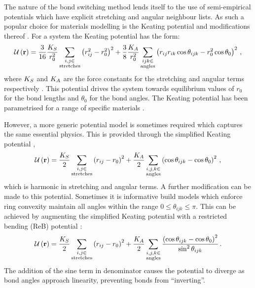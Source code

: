 The nature of the bond switching method lends itself to the use of semi\--empirical potentials which have explicit stretching and angular neighbour lists.
As such a popular choice for materials modelling is the Keating potential and modifications thereof \cite{Keating1966,Barkema2000}. 
For a \td{} system the Keating potential has the form:
\begin{equation}
	\label{eq:keating}
	\mathcal{U}\left(\mathbf{r}\right) = \frac{3}{16}\frac{K_S}{r_0^2}\sum_{\substack{i,j \in \\ \text{stretches}}} \left(r_{ij}^2-r_0^2\right)^2+
	\frac{3}{8}\frac{K_A}{r_0^2}\sum_{\substack{ijk \in \\ \text{angles}}}\left(r_{ij}r_{ik}\cos\theta_{ijk}-r_0^2\cos\theta_0\right)^2 \,,
\end{equation}
where $K_S$ and $K_A$ are the force constants for the stretching and angular terms respectively \cite{Kumar2012}.
This potential drives the system towards equilibrium values of $r_0$ for the bond lengths and $\theta_0$ for the bond angles.
The Keating potential has been parametrised for a range of specific materials \cite{Kumar2012,Drabold2009}. 

However, a more generic potential model is sometimes required which captures the same essential physics.
This is provided through the simplified Keating potential \cite{VonAlfthan2003},
\begin{equation}
	\mathcal{U}\left(\mathbf{r}\right) = \frac{K_S}{2}\sum_{\substack{i,j\in \\ \text{stretches}}}\left(r_{ij}-r_0\right)^2 + \frac{K_A}{2}\sum_{\substack{i,j,k \in \\ \text{angles}}} \left(\cos\theta_{ijk}-\cos\theta_0\right)^2\,,
\end{equation}
which is harmonic in stretching and angular terms.
A further modification can be made to this potential. 
Sometimes it is informative build models which enforce ring convexity \ie{} maintain all angles within the range $0\leq \theta_{ijk} \leq \pi$.
This can be achieved by augmenting the simplified Keating potential with a restricted bending (ReB) potential \cite{Bulacu2013}:
\begin{equation}
	\mathcal{U}\left(\mathbf{r}\right) = \frac{K_S}{2}\sum_{\substack{i,j\in \\ \text{stretches}}}\left(r_{ij}-r_0\right)^2 + \frac{K_A}{2}\sum_{\substack{i,j,k \in \\ \text{angles}}} \frac{\left(\cos\theta_{ijk}-\cos\theta_0\right)^2}{\sin^{2}\theta_{ijk}}\,.
\end{equation}
The addition of the sine term in denominator causes the potential to diverge as bond angles approach linearity, preventing bonds from ``inverting''.


